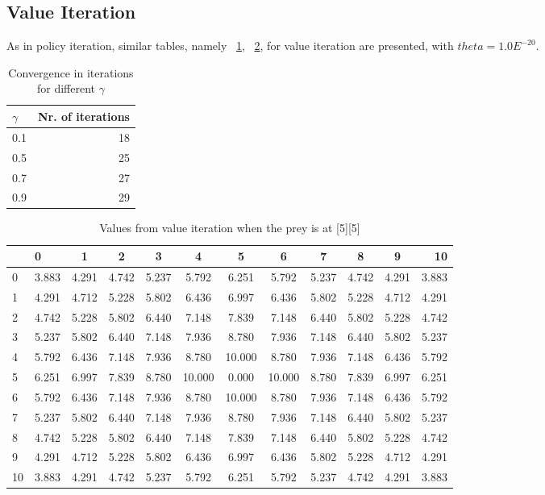 \documentclass[paper=a4, fontsize=11pt]{scrartcl}
\numberwithin{equation}{section}		%
\numberwithin{figure}{section}			%
\numberwithin{table}{section}				%
\begin{document}
\subsection{Value Iteration}
As in policy iteration, similar tables, namely ~\ref{convVIter}, ~\ref{vitS}, for value iteration are presented, with $theta = 1.0E^{-20}$. 
\begin{table}[H]
\caption{Convergence in iterations for different $\gamma$}
\centering
\begin{tabular}{|l||r|}
\hline
$\gamma$ & Nr. of iterations\\
\hline
0.1& 18\\
\hline
0.5& 25\\
\hline
0.7& 27\\
\hline
0.9& 29\\
\hline
\end{tabular}
\label{convVIter}
\end{table}

\begin{table}[H]
\caption{Values from value iteration when the prey is at [5][5]}
\centering
\begin{tabular}{l|l*{9}{c}r}
  \hline
 & 0 & 1 & 2 & 3 & 4 & 5 & 6 & 7 & 8 & 9 & 10 \\ \hline 
0 & 3.883 & 4.291 & 4.742 & 5.237 & 5.792 & 6.251 & 5.792 & 5.237 & 4.742 & 4.291 & 3.883 \\
1 & 4.291 & 4.712 & 5.228 & 5.802 & 6.436 & 6.997 & 6.436 & 5.802 & 5.228 & 4.712 & 4.291 \\
2 & 4.742 & 5.228 & 5.802 & 6.440 & 7.148 & 7.839 & 7.148 & 6.440 & 5.802 & 5.228 & 4.742 \\
3 & 5.237 & 5.802 & 6.440 & 7.148 & 7.936 & 8.780 & 7.936 & 7.148 & 6.440 & 5.802 & 5.237 \\
4 & 5.792 & 6.436 & 7.148 & 7.936 & 8.780 & 10.000 & 8.780 & 7.936 & 7.148 & 6.436 & 5.792 \\
5 & 6.251 & 6.997 & 7.839 & 8.780 & 10.000 & 0.000 & 10.000 & 8.780 & 7.839 & 6.997 & 6.251 \\
6 & 5.792 & 6.436 & 7.148 & 7.936 & 8.780 & 10.000 & 8.780 & 7.936 & 7.148 & 6.436 & 5.792 \\
7 & 5.237 & 5.802 & 6.440 & 7.148 & 7.936 & 8.780 & 7.936 & 7.148 & 6.440 & 5.802 & 5.237 \\
8 & 4.742 & 5.228 & 5.802 & 6.440 & 7.148 & 7.839 & 7.148 & 6.440 & 5.802 & 5.228 & 4.742 \\
9& 4.291 & 4.712 & 5.228 & 5.802 & 6.436 & 6.997 & 6.436 & 5.802 & 5.228 & 4.712 & 4.291 \\
10& 3.883 & 4.291 & 4.742 & 5.237 & 5.792 & 6.251 & 5.792 & 5.237 & 4.742 & 4.291 & 3.883
\end{tabular}
\label{vitS}
\end{table}
\end{document}
